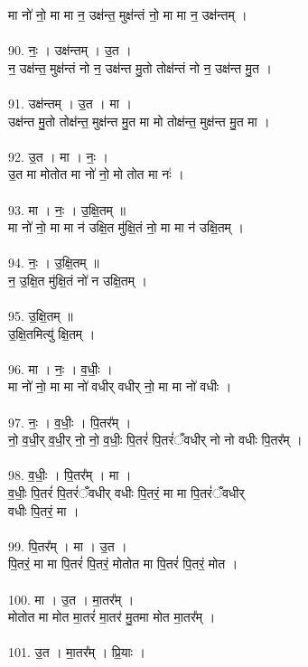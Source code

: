 मा नो॑ नो॒ मा मा न॒ उक्ष॑न्त॒ मुक्ष॑न्तं नो॒ मा मा न॒ उक्ष॑न्तम् ।\\
\\
90. नः॒ । उक्ष॑न्तम् । उ॒त ।\\
न॒ उक्ष॑न्त॒ मुक्ष॑न्तं नो न॒ उक्ष॑न्त मु॒तो तोक्ष॑न्तं नो न॒ उक्ष॑न्त मु॒त ।\\
\\
91. उक्ष॑न्तम् । उ॒त । मा ।\\
उक्ष॑न्त मु॒तो तोक्ष॑न्त॒ मुक्ष॑न्त मु॒त मा मो तोक्ष॑न्त॒ मुक्ष॑न्त मु॒त मा ।\\
\\
92. उ॒त । मा । नः॒ ।\\
उ॒त मा मोतोत मा नो॑ नो॒ मो तोत मा नः॑ ।\\
\\
93. मा । नः॒ । उ॒क्षि॒तम् ॥\\
मा नो॑ नो॒ मा मा न॑ उक्षि॒त मु॑क्षि॒तं नो॒ मा मा न॑ उक्षि॒तम् ।\\
\\
94. नः॒ । उ॒क्षि॒तम् ॥\\
न॒ उ॒क्षि॒त मु॑क्षि॒तं नो॑ न उक्षि॒तम् ।\\
\\
95. उ॒क्षि॒तम् ॥\\
उ॒क्षि॒तमित्यु॑ क्षि॒तम् ।\\
\\
96. मा । नः॒ । व॒धीः॒ ।\\
मा नो॑ नो॒ मा मा नो॑ वधीर् वधीर् नो॒ मा मा नो॑ वधीः ।\\
\\
97. नः॒ । व॒धीः॒ । पि॒तर᳚म् ।\\
नो॒ व॒धी॒र् व॒धी॒र् नो॒ नो॒ व॒धीः॒ पि॒तरं॑ पि॒तरं॑ँवधीर् नो नो वधीः पि॒तर᳚म् ।\\
\\
98. व॒धीः॒ । पि॒तर᳚म् । मा ।\\
व॒धीः॒ पि॒तरं॑ पि॒तरं॑ँवधीर् वधीः पि॒तरं॒ मा मा पि॒तरं॑ँवधीर्\\
वधीः पि॒तरं॒ मा ।\\
\\
99. पि॒तर᳚म् । मा । उ॒त ।\\
पि॒तरं॒ मा मा पि॒तरं॑ पि॒तरं॒ मोतोत मा पि॒तरं॑ पि॒तरं॒ मोत ।\\
\\
100. मा । उ॒त । मा॒तर᳚म् ।\\
मोतोत मा मोत मा॒तरं॑ मा॒तर॑ मु॒तमा मोत मा॒तर᳚म् ।\\
\\
101. उ॒त । मा॒तर᳚म् । प्रि॒याः ।\\
